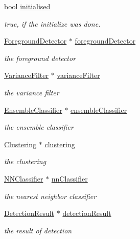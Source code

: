 \begin{DoxyCompactItemize}
bool \hyperlink{classtld_1_1DetectorCascade_a4a61cd265a92bce6f8f148db532a1789}{initialised}
\begin{DoxyCompactList}\small\item\em true, if the initialize was done. \end{DoxyCompactList}\item 
\hyperlink{classtld_1_1ForegroundDetector}{Foreground\-Detector} $\ast$ \hyperlink{classtld_1_1DetectorCascade_ad03faad5b05805f5edba330cccfee1f1}{foreground\-Detector}
\begin{DoxyCompactList}\small\item\em the foreground detector \end{DoxyCompactList}\item 
\hyperlink{classtld_1_1VarianceFilter}{Variance\-Filter} $\ast$ \hyperlink{classtld_1_1DetectorCascade_a5d2600fc22f6cc39ef1940457324c5eb}{variance\-Filter}
\begin{DoxyCompactList}\small\item\em the variance filter \end{DoxyCompactList}\item 
\hyperlink{classtld_1_1EnsembleClassifier}{Ensemble\-Classifier} $\ast$ \hyperlink{classtld_1_1DetectorCascade_a818a0be0ff9f76fb42534a056761c163}{ensemble\-Classifier}
\begin{DoxyCompactList}\small\item\em the ensemble classifier \end{DoxyCompactList}\item 
\hyperlink{classtld_1_1Clustering}{Clustering} $\ast$ \hyperlink{classtld_1_1DetectorCascade_a5a5c292573778fa38a462921c1928e40}{clustering}
\begin{DoxyCompactList}\small\item\em the clustering \end{DoxyCompactList}\item 
\hyperlink{classtld_1_1NNClassifier}{N\-N\-Classifier} $\ast$ \hyperlink{classtld_1_1DetectorCascade_abc9da459b6d66e5a2f2658f52b4dfdc6}{nn\-Classifier}
\begin{DoxyCompactList}\small\item\em the nearest neighbor classifier \end{DoxyCompactList}\item 
\hyperlink{classtld_1_1DetectionResult}{Detection\-Result} $\ast$ \hyperlink{classtld_1_1DetectorCascade_a14544e4e2e7ca365e49969a6937aec51}{detection\-Result}
\begin{DoxyCompactList}\small\item\em the result of detection \end{DoxyCompactList}\end{DoxyCompactItemize}
